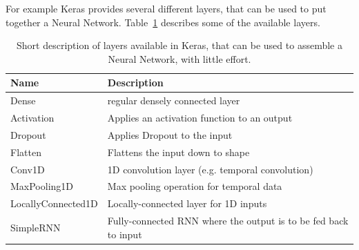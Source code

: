 For example Keras provides several different layers, that can be used to put together a Neural Network. Table~\ref{tab:methodology_tensorflow_alternativesToTensorflow_kerasLayers} describes some of the available layers.

\begin{center}
	\begin{table}[h!]
		\begin{tabular}{| l | l |}
			\hline
			\bfseries Name & \bfseries Description \\
			\hline
			Dense & regular densely connected layer \\
			\hline
			Activation & Applies an activation function to an output \\
			\hline
			Dropout & Applies Dropout to the input \\
			\hline
			Flatten & Flattens the input down to shape \\
			\hline
			Conv1D & 1D convolution layer (e.g. temporal convolution)  \\
			\hline
			MaxPooling1D & Max pooling operation for temporal data \\
			\hline
			LocallyConnected1D & Locally-connected layer for 1D inputs \\
			\hline
			SimpleRNN & Fully-connected RNN where the output is to be fed back to input \\
			\hline
			
		\end{tabular}
		\caption{Short description of layers available in Keras, that can be used to assemble a Neural Network, with little effort.}
		\label{tab:methodology_tensorflow_alternativesToTensorflow_kerasLayers}
	\end{table}
\end{center}

\filbreak
